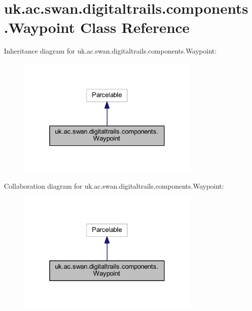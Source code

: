 \hypertarget{classuk_1_1ac_1_1swan_1_1digitaltrails_1_1components_1_1_waypoint}{\section{uk.\+ac.\+swan.\+digitaltrails.\+components.\+Waypoint Class Reference}
\label{classuk_1_1ac_1_1swan_1_1digitaltrails_1_1components_1_1_waypoint}
}


Inheritance diagram for uk.\+ac.\+swan.\+digitaltrails.\+components.\+Waypoint\+:\nopagebreak
\begin{figure}[H]
\begin{center}
\leavevmode
\includegraphics[width=255pt]{classuk_1_1ac_1_1swan_1_1digitaltrails_1_1components_1_1_waypoint__inherit__graph}
\end{center}
\end{figure}


Collaboration diagram for uk.\+ac.\+swan.\+digitaltrails.\+components.\+Waypoint\+:\nopagebreak
\begin{figure}[H]
\begin{center}
\leavevmode
\includegraphics[width=255pt]{classuk_1_1ac_1_1swan_1_1digitaltrails_1_1components_1_1_waypoint__coll__graph}
\end{center}
\end{figure}
